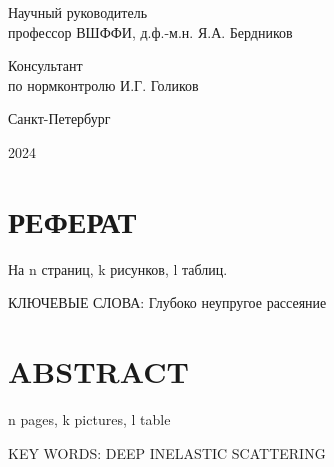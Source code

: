 \begin{titlepage}
\begin{flushleft}
Научный руководитель\\
профессор ВШФФИ, д.ф.-м.н.
\hspace{0.1 cm} \hspace{1.8 cm} 
\hfill  {Я.А. Бердников}
\vspace{0.5cm}

Консультант \\
по нормконтролю \hspace{2.1 cm} \hspace{2 cm} \hfill  {И.Г. Голиков}
\end{flushleft}


\begin{center}
	Санкт-Петербург
\end{center}
\begin{center}
    2024
\end{center}
\newpage
\pagestyle{empty}
\section*{РЕФЕРАТ}
\begin{center}
    На n страниц, k рисунков, l таблиц.
\end{center}
КЛЮЧЕВЫЕ СЛОВА: Глубоко неупругое рассеяние
\\


\section*{ABSTRACT}
\begin{center}
    n pages, k pictures, l table
\end{center} 
KEY WORDS: DEEP INELASTIC SCATTERING
\\


\end{titlepage}	